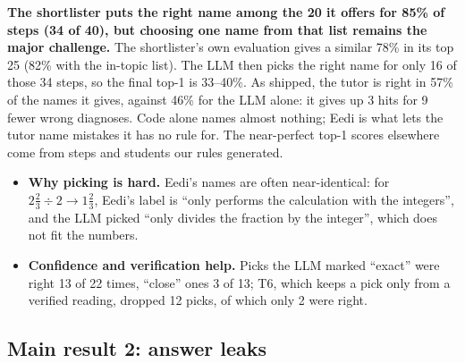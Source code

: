 \documentclass[11pt,a4paper]{article}
\begin{document}
\noindent\textbf{The shortlister puts the right name among the 20 it offers for 85\% of steps (34 of 40), but choosing one name from that list remains the major challenge.} The shortlister's own evaluation gives a similar 78\% in its top 25 (82\% with the in-topic list). The LLM then picks the right name for only 16 of those 34 steps, so the final top-1 is 33--40\%. As shipped, the tutor is right in 57\% of the names it gives, against 46\% for the LLM alone: it gives up 3 hits for 9 fewer wrong diagnoses. Code alone names almost nothing; Eedi is what lets the tutor name mistakes it has no rule for. The near-perfect top-1 scores elsewhere come from steps and students our rules generated.
\begin{itemize}
  \item \textbf{Why picking is hard.} Eedi's names are often near-identical: for $2\frac{2}{3} \div 2 \to 1\frac{2}{3}$, Eedi's label is ``only performs the calculation with the integers'', and the LLM picked ``only divides the fraction by the integer'', which does not fit the numbers.
  \item \textbf{Confidence and verification help.} Picks the LLM marked ``exact'' were right 13 of 22 times, ``close'' ones 3 of 13; T6, which keeps a pick only from a verified reading, dropped 12 picks, of which only 2 were right.
\end{itemize}


\subsection{Main result 2: answer leaks}\label{sec:r2}
\end{document}
